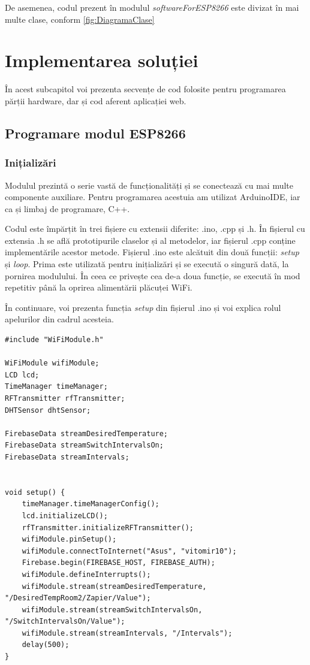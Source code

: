 	De asemenea, codul prezent în modulul \textit{softwareForESP8266} este divizat în mai multe clase, conform \ref{fig:DiagramaClase}

\section{Implementarea soluției}

	În acest subcapitol voi prezenta secvențe de cod folosite pentru programarea părții hardware, dar și cod aferent aplicației web.

\subsection{Programare modul ESP8266}

\subsubsection{Inițializări}

	Modulul prezintă o serie vastă de funcționalități și se conectează cu mai multe componente auxiliare. Pentru programarea acestuia am utilizat ArduinoIDE, iar ca și limbaj de programare, C++. 

	Codul este împărțit în trei fișiere cu extensii diferite: .ino, .cpp și .h. În fișierul cu extensia .h se află prototipurile claselor și al metodelor, iar fișierul .cpp conține implementările acestor metode. Fișierul .ino este alcătuit din două funcții: \textit{setup} și \textit{loop}. Prima este utilizată pentru inițializări și se execută o singură dată, la pornirea modulului. În ceea ce privește cea de-a doua funcție, se execută în mod repetitiv până la oprirea alimentării plăcuței WiFi.

\vspace{1em}

	În continuare, voi prezenta funcția \textit{setup} din fișierul .ino și voi explica rolul apelurilor din cadrul acesteia.



\begin{lstlisting}
#include "WiFiModule.h"

WiFiModule wifiModule;
LCD lcd;
TimeManager timeManager;
RFTransmitter rfTransmitter;
DHTSensor dhtSensor;

FirebaseData streamDesiredTemperature;
FirebaseData streamSwitchIntervalsOn;
FirebaseData streamIntervals;


void setup() {
    timeManager.timeManagerConfig();
    lcd.initializeLCD();
    rfTransmitter.initializeRFTransmitter();
    wifiModule.pinSetup();
    wifiModule.connectToInternet("Asus", "vitomir10");
    Firebase.begin(FIREBASE_HOST, FIREBASE_AUTH);
    wifiModule.defineInterrupts();
    wifiModule.stream(streamDesiredTemperature, "/DesiredTempRoom2/Zapier/Value");
    wifiModule.stream(streamSwitchIntervalsOn, "/SwitchIntervalsOn/Value");  
    wifiModule.stream(streamIntervals, "/Intervals");
    delay(500);
}
\end{lstlisting}

